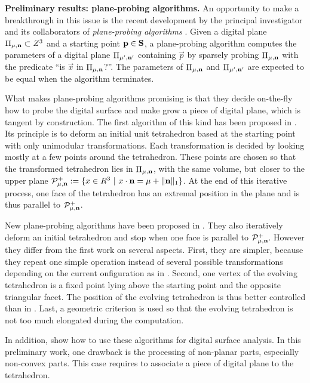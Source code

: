 \noindent\textbf{Preliminary results: plane-probing algorithms.}
An opportunity to make a breakthrough in this issue is the recent development
by the principal investigator and its collaborators of \emph{plane-probing
algorithms} \cite{LPRTCS2016, LPRDGCI2016, LPRJMIV2017}. 
Given a digital plane $\Pi_{\mu,\mathbf{n}} \subset Z^3$
and a starting point $\mathbf{p} \in \mathbf{S}$, 
a plane-probing algorithm computes the parameters of a digital plane $\Pi_{\mu',\mathbf{n}'}$
containing $\vec{p}$ by sparsely probing $\Pi_{\mu,\mathbf{n}}$ with the predicate
``is $\vec{x}$ in $\Pi_{\mu,\mathbf{n}}$?''. The parameters of $\Pi_{\mu,\mathbf{n}}$
and $\Pi_{\mu',\mathbf{n}'}$ are expected to be equal when the algorithm terminates.

What makes plane-probing algorithms promising is that they decide on-the-fly how
to probe the digital surface and make grow a piece of digital plane, which is
tangent by construction. 
The first algorithm of this kind has been proposed in \cite{LPRTCS2016}.
Its principle is to deform an initial unit tetrahedron based at the starting point
with only unimodular transformations. Each transformation is decided by looking
mostly at a few points around the tetrahedron. These points are chosen so that
the transformed tetrahedron lies in $\Pi_{\mu,\mathbf{n}}$, with the same volume,
but closer to the upper plane
$\mathcal{P}^{+}_{\mu,\mathbf{n}} := \{ x \in R^3 \ | \ x \cdot \mathbf{n} = \mu + \|\mathbf{n}\|_1 \}$.
At the end of this iterative process, one face of the tetrahedron has an extremal
position in the plane and is thus parallel to $\mathcal{P}^{+}_{\mu,\mathbf{n}}$.

New plane-probing algorithms have been proposed in \cite{LPRDGCI2016, LPRJMIV2017}. 
They also iteratively deform an initial tetrahedron and stop when one face is
parallel to $\mathcal{P}^{+}_{\mu,\mathbf{n}}$. 
However they differ from the first work on several aspects.  %
First, they are simpler, because they repeat one simple operation instead
of several possible transformations depending on the current onfiguration
as in \cite{LPRTCS2016}.  
Second, one vertex of the evolving tetrahedron is a fixed point lying above the 
starting point and the opposite triangular facet. The position of the evolving 
tetrahedron is thus better controlled than in \cite{LPRTCS2016}. 
Last, a geometric criterion is used so that the evolving tetrahedron is not
too much elongated during the computation.  

In addition, \cite{LPRJMIV2017} show how to use these algorithms
for digital surface analysis. In this preliminary work, one drawback is
the processing of non-planar parts, especially non-convex parts. This case
requires to associate a piece of digital plane to the tetrahedron.

